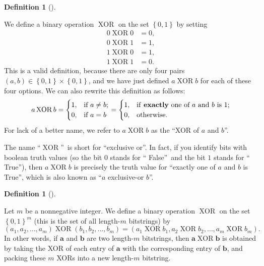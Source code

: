 \documentclass[numbers=enddot,12pt,final,onecolumn,notitlepage]{scrartcl}%
\numberwithin{exer}{subsection}
\theoremstyle{definition}
\newtheorem{defi}[theo]{Definition}
\newenvironment{definition}[1][]
{\begin{defi}[#1]\begin{leftbar}}
{\end{leftbar}\end{defi}}
\begin{document}
\begin{definition}
We define a binary operation $\operatorname*{XOR}$ on the set $\left\{
0,1\right\}  $ by setting%
\begin{align*}
0\operatorname*{XOR}0  &  =0,\\
0\operatorname*{XOR}1  &  =1,\\
1\operatorname*{XOR}0  &  =1,\\
1\operatorname*{XOR}1  &  =0.
\end{align*}
This is a valid definition, because there are only four pairs $\left(
a,b\right)  \in\left\{  0,1\right\}  \times\left\{  0,1\right\}  $, and we
have just defined $a\operatorname*{XOR}b$ for each of these four options. We
can also rewrite this definition as follows:%
\[
a\operatorname*{XOR}b=%
\begin{cases}
1, & \text{if }a\neq b;\\
0, & \text{if }a=b
\end{cases}
=%
\begin{cases}
1, & \text{if \textbf{exactly} one of }a\text{ and }b\text{ is }1;\\
0, & \text{otherwise.}%
\end{cases}
\]
For lack of a better name, we refer to $a\operatorname*{XOR}b$ as the
\textquotedblleft XOR of $a$ and $b$\textquotedblright.
\end{definition}

The name \textquotedblleft$\operatorname*{XOR}$\textquotedblright\ is short
for \textquotedblleft exclusive or\textquotedblright. In fact, if you identify
bits with boolean truth values (so the bit $0$ stands for \textquotedblleft
False\textquotedblright\ and the bit $1$ stands for \textquotedblleft
True\textquotedblright), then $a\operatorname*{XOR}b$ is precisely the truth
value for \textquotedblleft exactly one of $a$ and $b$ is
True\textquotedblright, which is also known as \textquotedblleft$a$
exclusive-or $b$\textquotedblright.

\begin{definition}
Let $m$ be a nonnegative integer. We define a binary operation
$\operatorname*{XOR}$ on the set $\left\{  0,1\right\}  ^{m}$ (this is the set
of all length-$m$ bitstrings) by%
\[
\left(  a_{1},a_{2},\ldots,a_{m}\right)  \operatorname*{XOR}\left(
b_{1},b_{2},\ldots,b_{m}\right)  =\left(  a_{1}\operatorname*{XOR}b_{1}%
,a_{2}\operatorname*{XOR}b_{2},\ldots,a_{m}\operatorname*{XOR}b_{m}\right)  .
\]
In other words, if $\mathbf{a}$ and $\mathbf{b}$ are two length-$m$
bitstrings, then $\mathbf{a}\operatorname*{XOR}\mathbf{b}$ is obtained by
taking the XOR of each entry of $\mathbf{a}$ with the corresponding entry of
$\mathbf{b}$, and packing these $m$ XORs into a new length-$m$ bitstring.
\end{definition}
\end{document}
